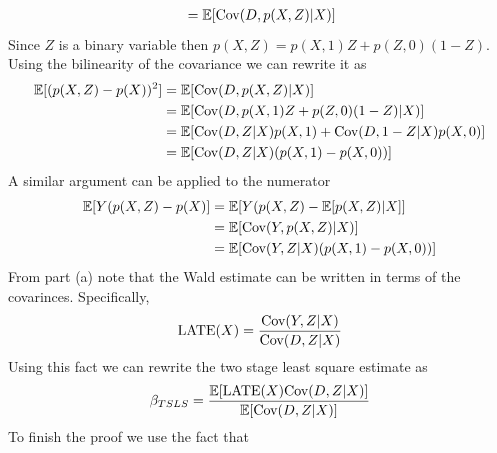 \documentclass{article}
\begin{document}
\begin{solution}
\begin{align*}
    &= \mathbb{E}[\text{Cov}(D,p(X,Z)\vert X)] \\ 
\end{align*}
Since $Z$ is a binary variable then $p(X,Z)=p(X,1)Z+p(Z,0)(1-Z)$. Using the bilinearity of the covariance we can rewrite it as 
\begin{align*}
    \mathbb{E}[(p(X,Z) - p(X))^2] &= \mathbb{E}[\text{Cov}(D,p(X,Z)\vert X)] \\ 
    &= \mathbb{E}[\text{Cov}(D,p(X,1)Z+p(Z,0)(1-Z)\vert X)] \\  
    &= \mathbb{E}[\text{Cov}(D,Z\vert X)p(X,1) + \text{Cov}(D,1-Z\vert X)p(X,0)] \\ 
    &= \mathbb{E}[\text{Cov}(D,Z\vert X)(p(X,1)-p(X,0))]
\end{align*}
A similar argument can be applied to the numerator
\begin{align*}
    \mathbb{E}[Y(p(X,Z) - p(X)] &= \mathbb{E}[Y(p(X,Z)-\mathbb{E}[p(X,Z)\vert X]] \\ 
    &= \mathbb{E}[\text{Cov}(Y,p(X,Z)\vert X)] \\ 
    &= \mathbb{E}[\text{Cov}(Y,Z\vert X)(p(X,1)-p(X,0))]
\end{align*}
From part (a) note that the Wald estimate can be written in terms of the covarinces. Specifically, 
\begin{equation*}
    \text{LATE}(X) = \frac{\text{Cov}(Y,Z\vert X)}{\text{Cov}(D,Z\vert X)}
\end{equation*}
Using this fact we can rewrite the two stage least square estimate as 
\begin{equation*}
    \beta_{TSLS} = \frac{\mathbb{E}[\text{LATE}(X)\text{Cov}(D,Z\vert X)]}{\mathbb{E}[\text{Cov}(D,Z\vert X)]}
\end{equation*}
To finish the proof we use the fact that 
\end{solution}
\end{document}
